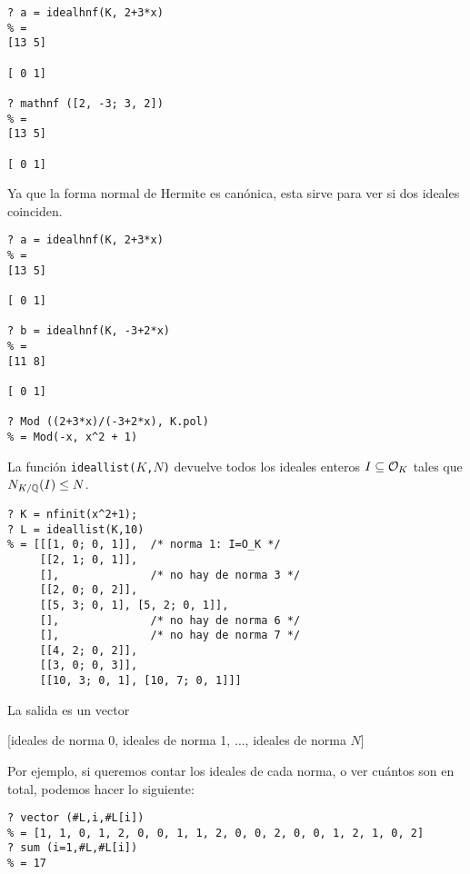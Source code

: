 \begin{shaded}
\begin{verbatim}
? a = idealhnf(K, 2+3*x)
% = 
[13 5]

[ 0 1]

? mathnf ([2, -3; 3, 2])
% = 
[13 5]

[ 0 1]
\end{verbatim}
\end{shaded}

Ya que la forma normal de Hermite es canónica, esta sirve para ver si dos
ideales coinciden.
\begin{shaded}
\begin{verbatim}
? a = idealhnf(K, 2+3*x)
% = 
[13 5]

[ 0 1]

? b = idealhnf(K, -3+2*x)
% =
[11 8]

[ 0 1]

? Mod ((2+3*x)/(-3+2*x), K.pol)
% = Mod(-x, x^2 + 1)
\end{verbatim}
\end{shaded}

La función \texttt{ideallist($K$,$N$)} devuelve todos los ideales enteros
$I \subseteq \mathcal{O}_K$ tales que $N_{K/\mathbb{Q}} (I) \le N$.

\begin{shaded}
\begin{verbatim}
? K = nfinit(x^2+1);
? L = ideallist(K,10)
% = [[[1, 0; 0, 1]],  /* norma 1: I=O_K */
     [[2, 1; 0, 1]],
     [],              /* no hay de norma 3 */
     [[2, 0; 0, 2]],
     [[5, 3; 0, 1], [5, 2; 0, 1]],
     [],              /* no hay de norma 6 */
     [],              /* no hay de norma 7 */ 
     [[4, 2; 0, 2]],
     [[3, 0; 0, 3]],
     [[10, 3; 0, 1], [10, 7; 0, 1]]]
\end{verbatim}
\end{shaded}

La salida es un vector
\begin{center}
[ideales de norma 0, ideales de norma 1, $\ldots$, ideales de norma $N$]
\end{center}

Por ejemplo, si queremos contar los ideales de cada norma, o ver cuántos son
en total, podemos hacer lo siguiente:
\begin{shaded}
\begin{verbatim}
? vector (#L,i,#L[i])
% = [1, 1, 0, 1, 2, 0, 0, 1, 1, 2, 0, 0, 2, 0, 0, 1, 2, 1, 0, 2]
? sum (i=1,#L,#L[i])
% = 17
\end{verbatim}
\end{shaded}

